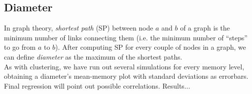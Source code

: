\subsection{Diameter}
In graph theory, \textit{shortest path} (SP) between node $a$ and $b$ of a graph is the minimum number of links connecting them (i.e. the minimum number of ``steps'' to go from $a$ to $b$).
After computing SP for every couple of nodes in a graph, we can define \textit{diameter} as the maximum of the shortest paths.\\
As with clustering, we have run out several simulations for every memory level, obtaining a diameter's mean-memory plot with standard deviations as errorbars. Final regression will point out possible correlations.
Results...


